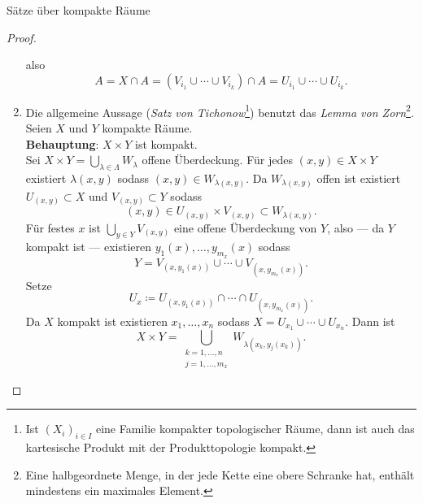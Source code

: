 \begin{theorem}{Sätze über kompakte Räume}
\begin{proof}
\begin{enumerate}
\begin{equation*}
        \end{equation*}
        also
        \begin{equation*}
          A = X \cap A = \left( V_{i_1} \cup \cdots \cup V_{i_k} \right) \cap A = U_{i_1} \cup \cdots \cup U_{i_k}\text{.}
        \end{equation*}
      \item Die allgemeine Aussage (\emph{Satz von Tichonow}\footnote{Ist $ (X_i)_{i \in I} $ eine Familie kompakter topologischer Räume, dann ist auch das kartesische Produkt mit der Produkttopologie kompakt.}) benutzt das \emph{Lemma von Zorn}\footnote{Eine halbgeordnete Menge, in der jede Kette eine obere Schranke hat, enthält mindestens ein maximales Element.}. \\
        Seien $ X $ und $ Y $ kompakte Räume. \\
        \textbf{Behauptung}: $ X \times Y $ ist kompakt. \\
        Sei $ X \times Y = \bigcup_{\lambda \in \Lambda} W_\lambda $ offene Überdeckung. Für jedes $ (x, y) \in X \times Y $ existiert $ \lambda(x, y) $ sodass $ (x,y) \in W_{\lambda(x,y)} $. Da $ W_{\lambda(x,y)} $ offen ist existiert $ U_{(x,y)} \subset X $ und $ V_{(x,y)} \subset Y $ sodass
        \begin{equation*}
          (x,y) \in U_{(x,y)} \times V_{(x,y)} \subset W_{\lambda(x,y)}\text{.}
        \end{equation*}
        Für festes $ x $ ist $ \bigcup_{y \in Y} V_{(x,y)} $ eine offene Überdeckung von $ Y $, also --- da $ Y $ kompakt ist --- existieren $ y_1(x),\dots,y_{m_x}(x) $ sodass
        \begin{equation*}
          Y = V_{(x, y_1(x))} \cup \cdots \cup V_{(x,y_{m_x}(x))}\text{.}
        \end{equation*}
        Setze
        \begin{equation*}
          U_x \coloneqq U_{(x,y_1(x))} \cap \cdots \cap U_{(x, y_{m_x}(x))}\text{.}
        \end{equation*}
        Da $ X $ kompakt ist existieren $ x_1, \dots, x_n $ sodass $ X = U_{x_1} \cup \cdots \cup U_{x_n} $. Dann ist
        \begin{equation*}
          X \times Y = \bigcup_{\substack{k = 1, \dots, n \\ j = 1, \dots, m_x}}W_{\lambda(x_k, y_j(x_k))}\text{.}
        \end{equation*}
    \end{enumerate}
  \end{proof}
\end{theorem}

